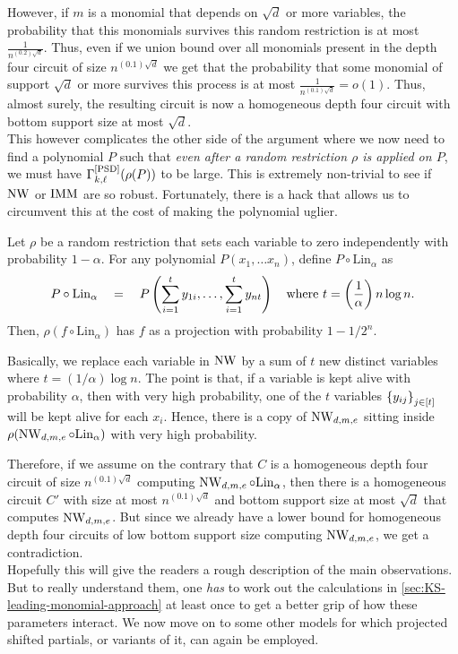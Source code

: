 However, if $m$ is a monomial that depends on $\sqrt{d}$ or more variables, the probability that this monomials survives this random restriction is at most $\frac{1}{n^{(0.2) \sqrt{d}}}$. Thus, even if we union bound over all monomials present in the depth four circuit of size $n^{(0.1)\sqrt{d}}$ we get
that the probability that some monomial of support $\sqrt{d}$ or more survives this process is at most $\frac{1}{n^{(0.1)\sqrt{d}}} = o(1)$. Thus, almost surely, the resulting circuit is now a homogeneous depth four circuit with bottom support size at most $\sqrt{d}$. \\

This however complicates the other side of the argument where we now need to find a polynomial $P$ such that \emph{even after a random restriction $\rho$ is applied on $P$}, we must have $\Gamma^{\mathrm{[PSD]}}_{k,\ell}(\rho(P))$ to be large. This is extremely non-trivial to see if $\operatorname{\mathrm{NW}}$ or $\operatorname{\mathrm{IMM}}$ are so robust. Fortunately, there is a hack that allows us to circumvent this at the cost of making the polynomial uglier. 

\begin{lemma*}
Let $\rho$ be a random restriction that sets each variable to zero independently with probability $1 - \alpha$. 
For any polynomial $P(x_1,\dots x_n)$, define $P \circ \mathrm{Lin}_\alpha$ as
\[
P \circ \mathrm{Lin}_\alpha \quad = \quad P\left(\sum_{i=1}^t y_{1i}, \ldots, \sum_{i=1}^t y_{nt}\right)\quad \text{where $t = \left(\frac{1}{\alpha}\right) n \log n$}.
\]
Then, $\rho(f \circ \mathrm{Lin}_\alpha)$ has $f$ as a projection with probability $1 - 1/2^{n}$. 
\end{lemma*}

Basically, we replace each variable in $\operatorname{\mathrm{NW}}$ by a sum of $t$ new distinct variables where $t = (1/\alpha) \log n$. The point is that, if a variable is kept alive with probability $\alpha$, then with very high probability, one of the $t$ variables $\left\{y_{ij}\right\}_{j\in [t]}$ will be kept alive for each $x_i$. Hence, there is a copy of $\operatorname{\mathrm{NW}}_{d,m,e}$ sitting inside $\rho(\operatorname{\mathrm{NW}}_{d,m,e} \circ \mathrm{Lin}_\alpha)$ with very high probability. 

Therefore, if we assume on the contrary that $C$ is a homogeneous depth four circuit of size $n^{(0.1)\sqrt{d}}$ computing $\operatorname{\mathrm{NW}}_{d,m,e} \circ \mathrm{Lin}_\alpha$, then there is a homogeneous circuit $C'$ with size at most $n^{(0.1)\sqrt{d}}$ and bottom support size at most $\sqrt{d}$ that computes $\operatorname{\mathrm{NW}}_{d,m,e}$. But since we already have a lower bound for homogeneous depth four circuits of low bottom support size computing $\operatorname{\mathrm{NW}}_{d,m,e}$, we get a contradiction. \\

Hopefully this will give the readers a rough description of the main observations. But to really understand them, one \emph{has} to work out the calculations in \autoref{sec:KS-leading-monomial-approach} at least once to get a better grip of how these parameters interact. We now move on to some other models for which projected shifted partials, or variants of it, can again be employed. 


